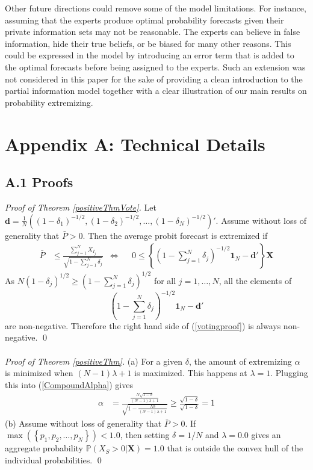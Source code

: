 \documentclass[11pt]{article}
\renewcommand{\P}{\mathbb{P}}
\theoremstyle{definition}
\theoremstyle{definition}
\begin{document}
 
 Other future directions could  remove some of the model limitations. For instance, assuming that the experts produce optimal probability forecasts given their private information sets may not be reasonable. The experts can believe in false information, hide their true beliefs, or be biased for many other reasons. This could be expressed in the model by introducing an error term that is added to the optimal forecasts before being assigned to the experts. Such an extension was not considered in this paper for the sake of providing a clean introduction to the partial information model together with a clear illustration of our main results on  probability extremizing. 
 
  \appendix 
\section*{Appendix A: Technical Details}
\label{appendix}

\subsection*{A.1  Proofs}
\textit{Proof of Theorem \ref{positiveThmVote}.} Let $\boldsymbol{d} = \frac{1}{N}\left((1-\delta_1)^{-1/2}, (1-\delta_2)^{-1/2}, \dots, (1-\delta_N)^{-1/2}\right)'$. Assume without loss of generality that $\bar{P} > 0$. Then the average probit forecast is extremized if
\begin{align}
 \bar{P}&\leq  \frac{\sum_{j=1}^N X_{I_j}}{\sqrt{1 - \sum_{j=1}^N \delta_j}} &\Leftrightarrow&& 0 \leq  \left\{  \left(1 - \sum_{j=1}^N \delta_j \right)^{-1/2} \boldsymbol{1}_N - \boldsymbol{d}' \right\} \boldsymbol{X} \label{votingproof}
\end{align}
 As $N (1-\delta_j)^{1/2} \geq \left(1 - \sum_{j=1}^N \delta_j \right)^{1/2}$ for all $j = 1, \dots, N$, all the elements of $$\left(1 - \sum_{j=1}^N \delta_j \right)^{-1/2} \boldsymbol{1}_N - \boldsymbol{d}' $$ are non-negative. Therefore the right hand side of (\ref{votingproof}) is always non-negative. \qed
 \\
 \\
\noindent
\textit{Proof of Theorem \ref{positiveThm}.} (a) For a given $\delta$, the amount of extremizing $\alpha$ is minimized when $(N-1)\lambda +1$ is maximized. This happens at $\lambda = 1$. Plugging this into (\ref{CompoundAlpha}) gives
\begin{align*}
\alpha &= \frac{\frac{N\sqrt{1-\delta}}{(N-1)\lambda +1}}{\sqrt{1- \frac{N\delta}{(N-1)\lambda +1} }}  \geq \frac{\sqrt{1-\delta}}{\sqrt{1-\delta }} = 1
\end{align*}
(b) Assume without loss of generality that $\bar{P} > 0$. If $\max(\left\{p_1, p_2, \dots, p_N \right\}) < 1.0$, then  setting $\delta = 1/N$ and $\lambda = 0.0$ gives an aggregate probability $\P\left(X_S > 0 | \boldsymbol{X}\right) = 1.0$ that is outside the convex hull of the individual probabilities.
\qed
\end{document}
